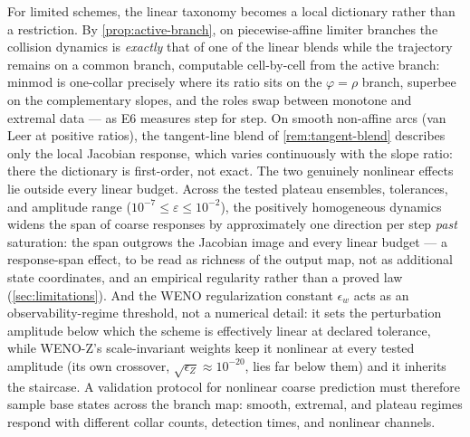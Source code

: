 \documentclass[pdflatex,sn-mathphys-num]{sn-jnl}%
\theoremstyle{thmstyleone}%
\theoremstyle{thmstyletwo}%
\theoremstyle{thmstylethree}%
\begin{document}
For limited schemes, the linear taxonomy becomes a local dictionary rather than a restriction.
By \cref{prop:active-branch}, on piecewise-affine limiter branches the collision dynamics is \emph{exactly} that of one of the linear blends while the trajectory remains on a common branch, computable cell-by-cell from the active branch: minmod is one-collar precisely where its ratio sits on the $\varphi=\rho$ branch, superbee on the complementary slopes, and the roles swap between monotone and extremal data --- as E6 measures step for step.
On smooth non-affine arcs (van Leer at positive ratios), the tangent-line blend of \cref{rem:tangent-blend} describes only the local Jacobian response, which varies continuously with the slope ratio: there the dictionary is first-order, not exact.
The two genuinely nonlinear effects lie outside every linear budget.
Across the tested plateau ensembles, tolerances, and amplitude range ($10^{-7}\le\varepsilon\le10^{-2}$), the positively homogeneous dynamics widens the span of coarse responses by approximately one direction per step \emph{past} saturation: the span outgrows the Jacobian image and every linear budget --- a response-span effect, to be read as richness of the output map, not as additional state coordinates, and an empirical regularity rather than a proved law (\cref{sec:limitations}).
And the WENO regularization constant $\epsilon_w$ acts as an observability-regime threshold, not a numerical detail: it sets the perturbation amplitude below which the scheme is effectively linear at declared tolerance, while WENO-Z's scale-invariant weights keep it nonlinear at every tested amplitude (its own crossover, $\sqrt{\epsilon_Z}\approx10^{-20}$, lies far below them) and it inherits the staircase.
A validation protocol for nonlinear coarse prediction must therefore sample base states across the branch map: smooth, extremal, and plateau regimes respond with different collar counts, detection times, and nonlinear channels.
\end{document}
